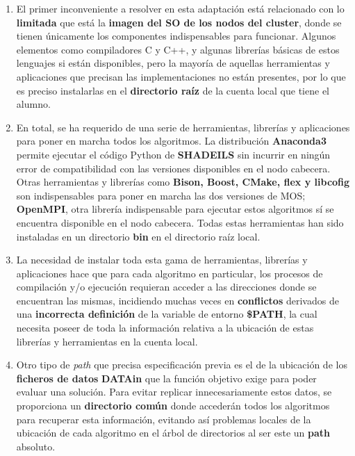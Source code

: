 \begin{enumerate}
	\item El primer inconveniente a resolver en esta adaptación está relacionado con lo \textbf{limitada} que está la \textbf{imagen del SO de los nodos del cluster}, donde se tienen únicamente los componentes indispensables para funcionar. Algunos elementos como compiladores C y C++, y algunas librerías básicas de estos lenguajes si están disponibles, pero la mayoría de aquellas herramientas y aplicaciones que precisan las implementaciones no están presentes, por lo que es preciso instalarlas en el \textbf{directorio raíz} de la cuenta local que tiene el alumno. 
	
	\item En total, se ha requerido de una serie de herramientas, librerías y aplicaciones para poner en marcha todos los algoritmos. La distribución \textbf{Anaconda3} permite ejecutar el código Python de \textbf{SHADEILS} sin incurrir en ningún error de compatibilidad con las versiones disponibles en el nodo cabecera. Otras herramientas y librerías como \textbf{Bison, Boost, CMake, flex y libcofig} son indispensables para poner en marcha las dos versiones de MOS; \textbf{OpenMPI}, otra librería indispensable para ejecutar estos algoritmos sí se encuentra disponible en el nodo cabecera. Todas estas herramientas han sido instaladas en un directorio \textbf{bin} en el directorio raíz local.
	
	\item La necesidad de instalar toda esta gama de herramientas, librerías y aplicaciones hace que para cada algoritmo en particular, los procesos de compilación y/o ejecución requieran acceder a las direcciones donde se encuentran las mismas, incidiendo muchas veces en \textbf{conflictos} derivados de una \textbf{incorrecta definición} de la variable de entorno \textbf{\$PATH}, la cual necesita poseer de toda la información relativa a la ubicación de estas librerías y herramientas en la cuenta local.
	
	\item Otro tipo de \textit{path} que precisa especificación previa es el de la ubicación de los \textbf{ficheros de datos} \textbf{DATAin} que la función objetivo exige para poder evaluar una solución. Para evitar replicar innecesariamente estos datos, se proporciona un \textbf{directorio común} donde accederán todos los algoritmos para recuperar esta información, evitando así problemas locales de la ubicación de cada algoritmo en el árbol de directorios al ser este un \textbf{path} absoluto.
	

\end{enumerate}
